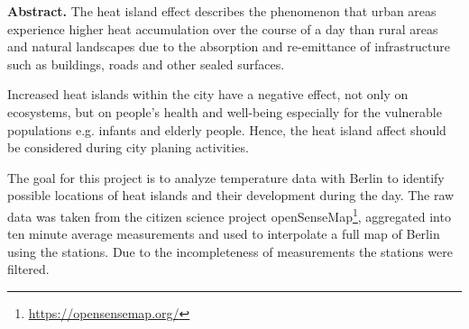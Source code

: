 
\noindent\textbf{Abstract.} The heat island effect describes the phenomenon that urban areas experience higher heat accumulation over the course of a day than rural areas and natural landscapes due to the absorption and re-emittance of infrastructure such as buildings, roads and other sealed surfaces.

Increased heat islands within the city have a negative effect, not only on ecosystems, but on people’s health and well-being especially for the vulnerable populations e.g. infants and elderly people. Hence, the heat island affect should be considered during city planing activities.

The goal for this project is to analyze temperature data with Berlin to identify possible locations of heat islands and their development during the day. The raw data was taken from the citizen science project openSenseMap\footnote{\url{https://opensensemap.org/}}, aggregated into ten minute average measurements and used to interpolate a full map of Berlin using the stations. Due to the incompleteness of measurements the stations were filtered.
